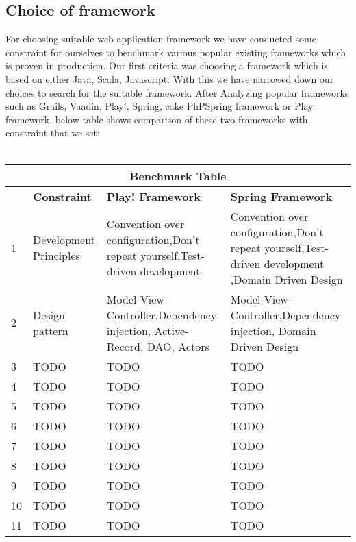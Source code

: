 \subsection{Choice of framework}
For choosing suitable web application framework we have conducted some  constraint for ourselves to benchmark various popular existing frameworks which is proven in production. Our first criteria was choosing a framework which is based on either Java, Scala, Javascript. With this we have narrowed down our choices to search for the suitable framework. After Analyzing popular frameworks such as Grails, Vaadin, Play!, Spring, cake PhPSpring framework or Play framework. below table shows comparison of these two frameworks with constraint that we set:\\\\

\begin{tabular}{ |p{1cm}||p{3cm}|p{6cm}|p{6cm}|  }
 \hline
 \multicolumn{4}{|c|}{\textbf{Benchmark Table}} \\
 \hline
 ~ & \textbf{Constraint} & \textbf{Play! Framework} & \textbf{Spring Framework}\\
 \hline
 1   & Development Principles & Convention over configuration,Don't repeat yourself,Test-driven development & Convention over configuration,Don't repeat yourself,Test-driven development ,Domain Driven Design   \\
 \hline
 2 & Design pattern &   Model-View-Controller,Dependency injection, Active-Record, DAO, Actors  & Model-View-Controller,Dependency injection, Domain Driven Design \\
 \hline
 3 &TODO & TODO&  TODO\\
 \hline
 4   &TODO & TODO &  TODO\\
 \hline
 5&   TODO  &TODO&TODO\\
 \hline
 6&   TODO  & TODO&TODO\\
 \hline
 7&   TODO & TODO&TODO\\
 \hline
 8&   TODO  & TODO&TODO\\
 \hline
 9&   TODO  & TODO & TODO\\
 \hline
 10&   TODO & TODO & TODO\\
 \hline
 11&   TODO & TODO&TODO\\
 \hline
\end{tabular}



